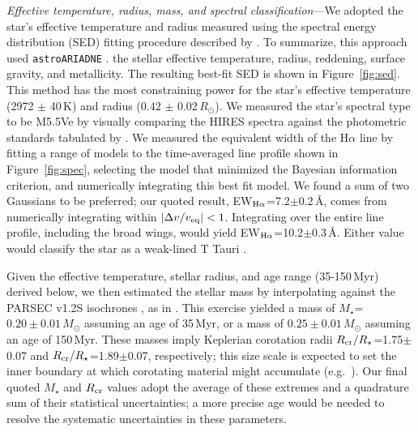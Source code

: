 \documentclass[11pt,twocolumn,tighten]{aastex7}
\begin{document}
{\it Effective temperature, radius, mass, and spectral
classification}---We adopted the star's effective temperature and
radius measured using the spectral energy distribution (SED) fitting
procedure described by \citet{Bouma2024}.  To summarize, this approach
used \texttt{astroARIADNE} \citep{Vines2022} .
 the stellar effective temperature,
radius, reddening, surface gravity, and metallicity.  The resulting
best-fit SED is shown in Figure~\ref{fig:sed}.  This method has the
most constraining power for the star's effective temperature (2972
$\pm$ 40\,K) and radius (0.42 $\pm$ 0.02\,$R_\odot$).  We measured the
star's spectral type to be M5.5Ve by visually comparing the HIRES
spectra against the photometric standards tabulated by
\citet{Bochanski2007}.   We measured the equivalent width of the
H$\alpha$ line by fitting a range of models to the time-averaged line
profile shown in Figure~\ref{fig:spec}, selecting the model that
minimized the Bayesian information criterion, and numerically
integrating this best fit model.  We found a sum of two Gaussians to
be preferred; our quoted result, EW$_{{\rm
H}\alpha}$=7.2$\pm$0.2\,\AA, comes from numerically integrating within
$|\Delta v/v_{\rm eq}|<1$.  Integrating over the entire line profile,
including the broad wings, would yield EW$_{{\rm
H}\alpha}$=10.2$\pm$0.3\,\AA. Either value would classify the star as
a weak-lined T Tauri \citep{Briceno2019}.

Given the effective temperature, stellar radius, and age range
(35-150\,Myr) derived below, we then estimated the stellar mass by
interpolating against the PARSEC v1.2S isochrones \citep{Chen2014}, as
in \citet{Bouma2024}.  This exercise yielded a mass of
$M_\star$=$0.20\pm0.01$\,$M_\odot$ assuming an age of 35\,Myr, or a
mass of $0.25\pm0.01$\,$M_\odot$ assuming an age of 150\,Myr.  These
masses imply Keplerian corotation radii $R_{\rm
cr}/R_\star$=1.75$\pm$0.07 and $R_{\rm cr}/R_\star$=1.89$\pm$0.07,
respectively; this size scale is expected to set the inner boundary at
which corotating material might accumulate
(e.g.~\citealt{Townsend2005,Daley-Yates2024}).  Our final quoted
$M_\star$ and $R_{\rm cr}$ values adopt the average of these extremes
and a quadrature sum of their statistical uncertainties; a more
precise age would be needed to resolve the systematic uncertainties in
these parameters.
\end{document}
